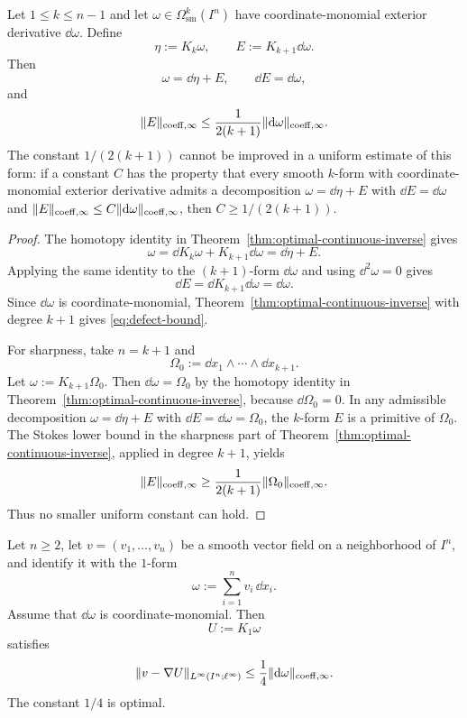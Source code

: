 \begin{proposition}
\label{prop:homotopy-decomposition}
Let $1\le k\le n-1$ and let
$\omega\in\Omega^k_{\mathrm{sm}}(I^n)$ have coordinate-monomial exterior
derivative $\dd\omega$. Define
\[
\eta:=K_k\omega,
\qquad
E:=K_{k+1}\dd\omega .
\]
Then
\[
\omega=\dd\eta+E,
\qquad
\dd E=\dd\omega,
\]
and
\begin{equation}
\label{eq:defect-bound}
\lVert E \rVert_{\mathrm{coeff},\infty}
\le
\frac{1}{2(k+1)}\lVert \mathrm{d}\omega \rVert_{\mathrm{coeff},\infty}.
\end{equation}
The constant $1/(2(k+1))$ cannot be improved in a uniform estimate of this
form: if a constant $C$ has the property that every smooth $k$-form with
coordinate-monomial exterior derivative admits a decomposition
$\omega=\dd\eta+E$ with $\dd E=\dd\omega$ and
$\lVert E \rVert_{\mathrm{coeff},\infty}\le C\lVert \mathrm{d}\omega \rVert_{\mathrm{coeff},\infty}$, then
$C\ge1/(2(k+1))$.
\end{proposition}

\begin{proof}
The homotopy identity in Theorem~\ref{thm:optimal-continuous-inverse} gives
\[
\omega=\dd K_k\omega+K_{k+1}\dd\omega=\dd\eta+E.
\]
Applying the same identity to the $(k+1)$-form $\dd\omega$ and using
$\dd^2\omega=0$ gives
\[
\dd E=\dd K_{k+1}\dd\omega=\dd\omega.
\]
Since $\dd\omega$ is coordinate-monomial, Theorem~\ref{thm:optimal-continuous-inverse}
with degree $k+1$ gives \eqref{eq:defect-bound}.

For sharpness, take $n=k+1$ and
\[
\Omega_0:=\dd x_1\wedge\cdots\wedge\dd x_{k+1}.
\]
Let $\omega:=K_{k+1}\Omega_0$. Then
$\dd\omega=\Omega_0$ by the homotopy identity in
Theorem~\ref{thm:optimal-continuous-inverse}, because $\dd\Omega_0=0$.
In any admissible decomposition
$\omega=\dd\eta+E$ with $\dd E=\dd\omega=\Omega_0$, the $k$-form $E$ is a
primitive of $\Omega_0$. The Stokes lower bound in the sharpness part of
Theorem~\ref{thm:optimal-continuous-inverse}, applied in degree $k+1$, yields
\[
\lVert E \rVert_{\mathrm{coeff},\infty}
\ge
\frac1{2(k+1)}\lVert \Omega_0 \rVert_{\mathrm{coeff},\infty}.
\]
Thus no smaller uniform constant can hold.
\end{proof}

\begin{corollary}
\label{cor:curl-reconstruction}
Let $n\ge2$, let $v=(v_1,\dots,v_n)$ be a smooth vector field on a
neighborhood of $I^n$, and identify it with the $1$-form
\[
\omega:=\sum_{i=1}^n v_i\,\dd x_i .
\]
Assume that $\dd\omega$ is coordinate-monomial. Then
\[
U:=K_1\omega
\]
satisfies
\[
\lVert v-\nabla U \rVert_{L^\infty(I^n;\ell^\infty)}
\le
\frac14\lVert \mathrm{d}\omega \rVert_{\mathrm{coeff},\infty}.
\]
The constant $1/4$ is optimal.
\end{corollary}

